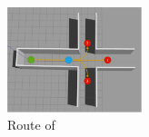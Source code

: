 \documentclass[10pt]{jarticle}
\begin{document}
    \begin{center}
        \begin{figure}[H]
            \centering
            \includegraphics[width=0.35\textwidth]{./fig/zyuziroute.pdf}
            \caption{Route of }
            \label{fig:exp}
        \end{figure}
    \end{center}
    
    
    
    
\end{document}
